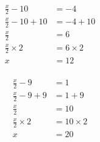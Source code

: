 \documentclass[12pt]{article}
\newcounter{minipagecount}
\begin{document}
\begin{multicols}{2}
\begin{minipage}[t]{0.45\textwidth} %
    \vspace{-26pt}  %
    \raggedright %
    \begin{align*} %
        \frac{x}{2} - 10 &= -4\\
        \frac{x}{2} - 10 + 10 &= -4 + 10\\
        \frac{x}{2} &= 6\\
        \frac{x}{2} \times2 &= 6 \times2\\
        x &= 12\\
    \end{align*}
\end{minipage} %
\noindent{(\theminipagecount)}\hspace{0.1mm} %
\begin{minipage}[t]{0.45\textwidth} %
    \vspace{-26pt}  %
    \raggedright %
    \begin{align*} %
        \frac{x}{2} - 9 &= 1\\
        \frac{x}{2} - 9 + 9 &= 1 + 9\\
        \frac{x}{2} &= 10\\
        \frac{x}{2} \times2 &= 10 \times2\\
        x &= 20\\
    \end{align*}
\end{minipage} %
\noindent{(\theminipagecount)}\hspace{0.1mm} %

\end{multicols}
\end{document}
